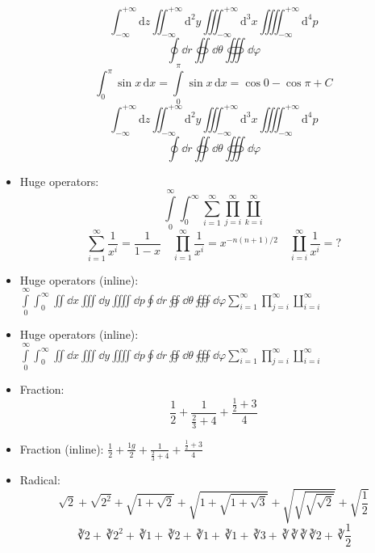 \documentclass { article }
\begin{document}
\begin{itemize}
\[        \]
        \[
          \int_{-\infty}^{+\infty}    \mathrm{d} z
          \iint_{-\infty}^{+\infty}   \mathrm{d}^2 y
          \iiint_{-\infty}^{+\infty}  \mathrm{d}^3 x
          \iiiint_{-\infty}^{+\infty} \mathrm{d}^4 p
        \]
        \[ \oint \dd{r} \oiint \dd{\theta} \oiiint \dd{\varphi}\]
        \begingroup
          \[
              \int_0^\pi        \sin x \, \mathrm{d} x
            = \int\limits_0^\pi \sin x \, \mathrm{d} x
            = \cos 0 - \cos\pi + C
          \]
          \[
            \int_{-\infty}^{+\infty}    \mathrm{d} z
            \iint_{-\infty}^{+\infty}   \mathrm{d}^2 y
            \iiint_{-\infty}^{+\infty}  \mathrm{d}^3 x
            \iiiint_{-\infty}^{+\infty} \mathrm{d}^4 p
          \]
          \[ \oint \dd{r} \oiint \dd{\theta} \oiiint \dd{\varphi} \]
        \endgroup
  \item Huge operators:
        \[
          \int\limits_0^\infty \int_0^\infty
          \sum_{i=1}^\infty \prod_{j=i}^\infty \coprod_{k=i}^\infty
        \]
        \[
          \sum_{i=1}^\infty    \frac{1}{x^i} = \frac{1}{1-x} \quad
          \prod_{i=1}^\infty   \frac{1}{x^i} = x^{-n(n+1)/2} \quad
          \coprod_{i=i}^\infty \frac{1}{x^i} = ?
        \]
  \item Huge operators (inline):
        $ \int\limits_0^\infty \int_0^\infty \iint \dd{x} \iiint \dd{y} \iiiint \dd{p}
          \oint \dd{r} \oiint \dd{\theta} \oiiint \dd{\varphi}
          \sum_{i=1}^\infty \prod_{j=i}^\infty \coprod_{i=i}^\infty $
  \item Huge operators (inline):
        \begingroup
          $ \int\limits_0^\infty \int_0^\infty \iint \dd{x} \iiint \dd{y} \iiiint \dd{p}
            \oint \dd{r} \oiint \dd{\theta} \oiiint \dd{\varphi}
            \sum_{i=1}^\infty \prod_{j=i}^\infty \coprod_{i=i}^\infty $
        \endgroup
  \item Fraction:
        \[ \frac{1}{2} + \frac{1}{\frac{2}{3}+4} + \frac{\frac{1}{2}+3}{4} \]
  \item Fraction (inline):
        $ \frac{1}{2} + \frac{1g}{2} + \frac{1}{\frac{2}{3}+4} + \frac{\frac{1}{2}+3}{4} $
  \item Radical:
        \[
            \sqrt{2} + \sqrt{2^2} + \sqrt{1+\sqrt{2}} + \sqrt{1+\sqrt{1+\sqrt{3}}}
          + \sqrt{\sqrt{\sqrt{\sqrt{2}}}} + \sqrt{\frac{1}{2}}
        \]
        \[
            \cuberoot{2} + \cuberoot{2^2} + \cuberoot{1+\cuberoot{2}}
          + \cuberoot{1+\cuberoot{1+\cuberoot{3}}}
          + \cuberoot{\cuberoot{\cuberoot{\cuberoot{2}}}} + \cuberoot{\frac{1}{2}}
\]
\end{itemize}
\end{document}
